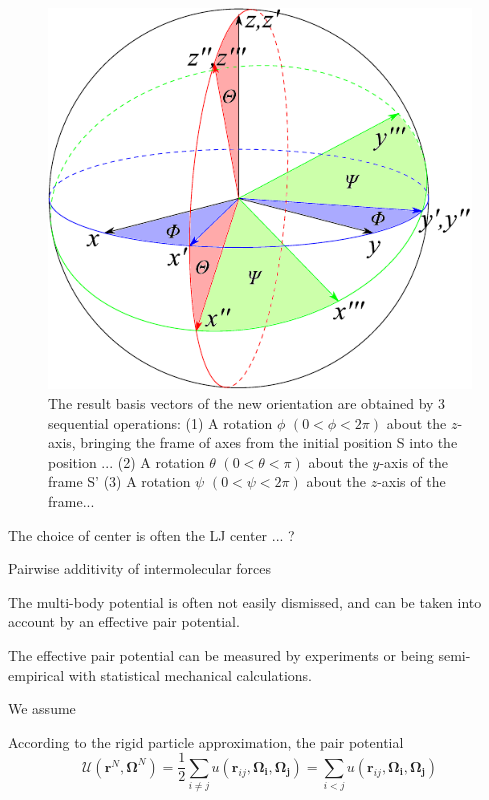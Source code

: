 \begin{figure}[h]
\begin{centering}
\includegraphics[scale=0.7]{_figure/euler_sphere}
\par\end{centering}

\caption [Euler angles]{The result basis vectors of the new orientation are
obtained by 3 sequential operations: (1) A rotation $\phi$ $(0<\phi<2\pi)$
about the $z$-axis, bringing the frame of axes from the initial position
S into the position ... (2) A rotation $\theta$ $(0<\theta<\pi)$
about the $y$-axis of the frame S' (3) A rotation $\psi$ $(0<\psi<2\pi)$
about the $z$-axis of the frame...\label{fig:Euler-angles}}
\end{figure}


The choice of center is often the LJ center ... ?

Pairwise additivity of intermolecular forces

The multi-body potential is often not easily dismissed, and can be taken into
account by an effective pair potential.

The effective pair potential can be measured by experiments \citep{Gray-Gubbins}
or being semi-empirical with statistical mechanical calculations.

We assume 

According to the rigid particle approximation, the pair potential
\[
\mathcal{U}(\mathbf{r}^{N},\mathbf{\Omega}^{N})=\frac{1}{2}\sum_{i\neq j}u(\mathbf{r}_{ij},\mathbf{\Omega_{i}},\mathbf{\Omega_{j}})=\sum_{i<j}u(\mathbf{r}_{ij},\mathbf{\Omega_{i}},\mathbf{\Omega_{j}})
\]


